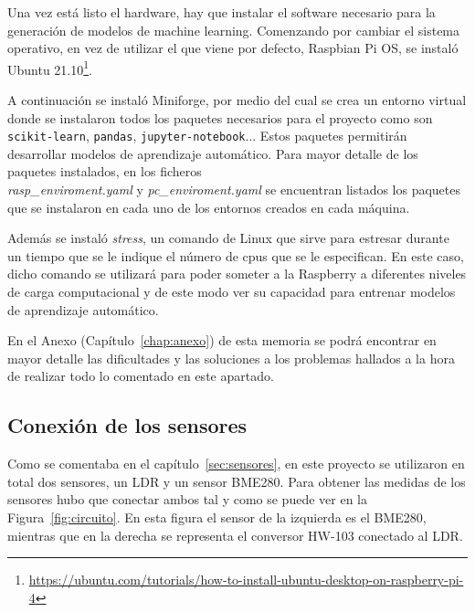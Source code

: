 \documentclass[a4paper, 12pt]{book}
\begin{document}
Una vez está listo el hardware, hay que instalar el software necesario para la generación de modelos de machine learning.
Comenzando por cambiar el sistema operativo, en vez de utilizar el que viene por defecto, Raspbian Pi OS, se instaló Ubuntu 21.10\footnote{\url{https://ubuntu.com/tutorials/how-to-install-ubuntu-desktop-on-raspberry-pi-4}}.

A continuación se instaló Miniforge, por medio del cual se crea un entorno virtual donde se instalaron todos los paquetes necesarios para el proyecto como son \texttt{scikit-learn}, \texttt{pandas}, \texttt{jupyter-notebook}... Estos paquetes permitirán desarrollar modelos de aprendizaje automático. Para mayor detalle de los paquetes instalados, en los ficheros \\\textit{rasp\_enviroment.yaml} y \textit{pc\_enviroment.yaml} se encuentran listados los paquetes que se instalaron en cada uno de los entornos creados en cada máquina.

Además se instaló \textit{stress}, un comando de Linux que sirve para estresar durante un tiempo que se le indique el número de cpus que se le especifican. En este caso, dicho comando se utilizará para poder someter a la Raspberry a diferentes niveles de carga computacional y de este modo ver su capacidad para entrenar modelos de aprendizaje automático. 

En el Anexo (Capítulo~\ref{chap:anexo}) de esta memoria se podrá encontrar en mayor detalle las dificultades y las soluciones a los problemas hallados a la hora de realizar todo lo comentado en este apartado.


\subsection{Conexión de los sensores}
\label{subsec:conexion_sensores}

Como se comentaba en el capítulo~\ref{sec:sensores}, en este proyecto se utilizaron en total dos sensores, un LDR y un sensor BME280. Para obtener las medidas de los sensores hubo que conectar ambos tal y como se puede ver en la Figura~\ref{fig:circuito}. En esta figura el sensor de la izquierda es el BME280, mientras que en la derecha se representa el conversor HW-103 conectado al LDR.
\end{document}
